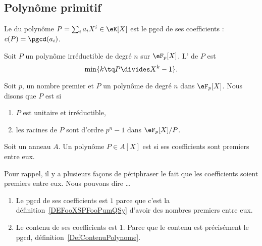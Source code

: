 \subsection{Polynôme primitif}

\begin{definition}\label{DefContenuPolynome}
    Le  du polynôme \( P=\sum_ia_iX^i\in\eK[X]\) est le pgcd de ses coefficients : $c(P)=\pgcd(a_i)$.
\end{definition}

\begin{definition}
    Soit \( P\) un polynôme irréductible de degré \( n\) sur \( \eF_p[X]\). L' de \( P\) est
    \begin{equation}
        \min\{ k\tq P\divides X^k-1 \}.
    \end{equation}
\end{definition}

\begin{definition}           \label{DEFooDVOOooKaPZQC}
    Soit \( p\), un nombre premier et \( P\) un polynôme de degré $n$ dans \( \eF_p[X]\). Nous disons que \( P\) est  si
    \begin{enumerate}
        \item
            \( P\) est unitaire et irréductible,
        \item
            les racines de \( P\) sont d'ordre \( p^n-1\) dans \( \eF_p[X]/P\).
    \end{enumerate}
\end{definition}

\begin{definition}       \label{DEFooAIYGooRAEfHU}
    Soit un anneau \( A\). Un polynôme \( P\in A[X]\) est  si ses coefficients sont premiers entre eux.
\end{definition}

\begin{normaltext}
    Pour rappel, il y a plusieurs façons de périphraser le fait que les coefficients soient premiers entre eux. Nous pouvons dire \ldots
    \begin{enumerate}
        \item
            Le pgcd de ses coefficients est \( 1\) parce que c'est la définition~\ref{DEFooXSPFooPumQSy} d'avoir des nombres premiers entre eux.
        \item
            Le contenu de ses coefficients est \( 1\). Parce que le contenu est précisément le pgcd, définition~\ref{DefContenuPolynome}.
    \end{enumerate}
\end{normaltext}

